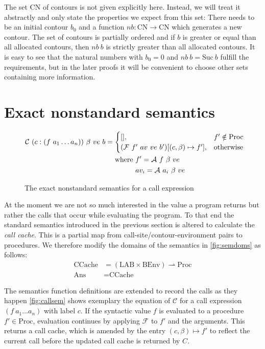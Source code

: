 \documentclass[a4paper,halfparskip,DIV=10,11pt]{scrbook}
\newcommand{\C}{\mathcal C}
\newcommand{\F}{\mathcal F}
\newcommand{\A}{\mathcal A}
\begin{document}
The set CN of contours is not given explicitly here. Instead, we will treat it abstractly and only state the properties we expect from this set: There needs to be an initial contour $b_0$ and a function $nb \colon \text{CN} \to \text{CN}$ which generates a new contour. The set of contours is partially ordered and if $b$ is greater or equal than all allocated contours, then $nb\ b$ is strictly greater than all allocated contours. It is easy to see that the natural numbers with $b_0 = 0$ and $nb\ b = \text{Suc}\ b$ fulfill the requirements, but in the later proofs it will be convenient to choose other sets containing more information. 

\section{Exact nonstandard semantics}

\begin{figure}
\begin{align*}
\C\ (c:(f\ a_1\ldots a_n))\ \beta\ ve\ b &= 
\begin{cases}
[], & f' \notin \text{Proc} \\
(\F\ f'\ av\ ve\ b' )[(c,\beta) \mapsto f'], &\text{otherwise}
\end{cases}\\
&\phantom{\strut=\strut}\text{where } f' = \A\ f\ \beta\ ve \\
&\phantom{\strut=\text{where }} av_i = \A\ a_i\ \beta\ ve \\
\end{align*}
\vspace{-1em}
\caption{The exact nonstandard semantics for a call expression}
\label{fig:callsem}
\end{figure}

At the moment we are not so much interested in the value a program returns but rather the calls that occur while evaluating the program. To that end the standard semantics introduced in the previous section is altered to calculate the \textit{call cache}. This is a partial map from call-site/contour-environment pairs to procedures. We therefore modify the domains of the semantics in \vref{fig:semdoms} as follows:
\begin{align*}
\text{CCache} &= (\text{LAB}\times\text{BEnv}) \rightharpoonup \text{Proc}\\
\text{Ans} &= \text{CCache}
\end{align*}

The semantics function definitions are extended to record the calls as they happen \vref{fig:callsem} shows exemplary the equation of $\C$ for a call expression $(f\ a_1\ldots a_n)$ with label $c$. If the syntactic value $f$ is evaluated to a procedure $f'\in \text{Proc}$, evaluation continues by applying $\F$ to $f'$ and the arguments. This returns a call cache, which is amended by the entry $(c,\beta) \mapsto f'$ to reflect the current call before the updated call cache is returned by $C$.
\end{document}
